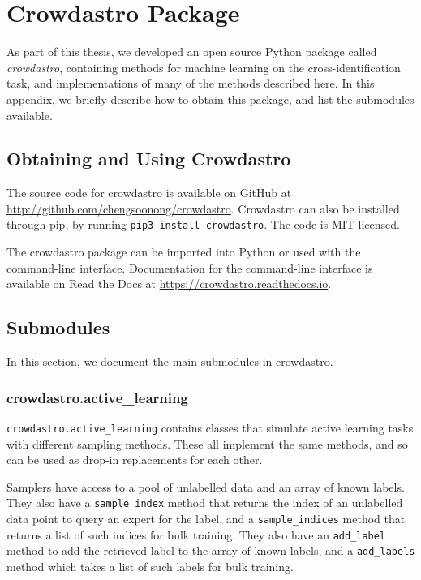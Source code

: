 
\appendix
\chapter{Crowdastro Package}
\label{cha:crowdastro}

As part of this thesis, we developed an open source Python package called
\emph{crowdastro}, containing methods for machine learning on the
cross-identification task, and implementations of many of the methods described
here. In this appendix, we briefly describe how to obtain this package, and list
the submodules available.

\section{Obtaining and Using Crowdastro}

    The source code for crowdastro is available on GitHub at
    \url{http://github.com/chengsoonong/crowdastro}. Crowdastro can also be
    installed through pip, by running \texttt{pip3 install crowdastro}. The code
    is MIT licensed.

    The crowdastro package can be imported into Python or used with the
    command-line interface. Documentation for the command-line interface is
    available on Read the Docs at \url{https://crowdastro.readthedocs.io}.

\section{Submodules}
    \label{sec:crowdastro-submodules}

    In this section, we document the main submodules in crowdastro.

    \subsection{crowdastro.active\_learning}
    \label{sec:crowdastro-active-learning}

        \texttt{crowdastro.active\_learning} contains classes that simulate
        active learning tasks with different sampling methods. These all
        implement the same methods, and so can be used as drop-in replacements
        for each other.

        Samplers have access to a pool of unlabelled data and an array of known
        labels. They also have a \texttt{sample\_index} method that returns the
        index of an unlabelled data point to query an expert for the label, and
        a \texttt{sample\_indices} method that returns a list of such indices
        for bulk training. They also have an \texttt{add\_label} method to add
        the retrieved label to the array of known labels, and a
        \texttt{add\_labels} method which takes a list of such labels for bulk
        training.

